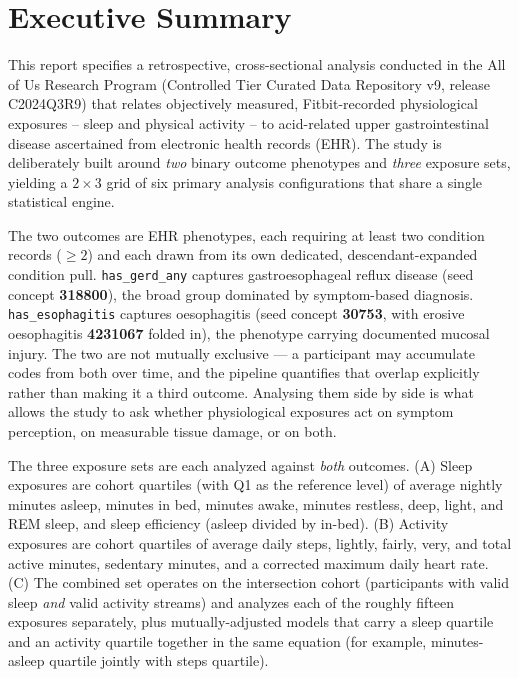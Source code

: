 \documentclass[11pt]{article}
\newcommand{\code}[1]{\texttt{\small #1}}
\begin{document}
\tableofcontents
\newpage

\newpage
\section{Executive Summary}

This report specifies a retrospective, cross-sectional analysis conducted in the All of Us Research Program (Controlled Tier Curated Data Repository v9, release C2024Q3R9) that relates objectively measured, Fitbit-recorded physiological exposures -- sleep and physical activity -- to acid-related upper gastrointestinal disease ascertained from electronic health records (EHR). The study is deliberately built around \emph{two} binary outcome phenotypes and \emph{three} exposure sets, yielding a $2 \times 3$ grid of six primary analysis configurations that share a single statistical engine.

The two outcomes are EHR phenotypes, each requiring at least two condition records
($\geq 2$) and each drawn from its own dedicated, descendant-expanded condition pull.
\code{has_gerd_any} captures gastroesophageal reflux disease (seed concept
\textbf{318800}), the broad group dominated by symptom-based diagnosis.
\code{has_esophagitis} captures oesophagitis (seed concept \textbf{30753}, with erosive
oesophagitis \textbf{4231067} folded in), the phenotype carrying documented mucosal injury.
The two are not mutually exclusive --- a participant may accumulate codes from both over
time, and the pipeline quantifies that overlap explicitly rather than making it a third
outcome. Analysing them side by side is what allows the study to ask whether physiological
exposures act on symptom perception, on measurable tissue damage, or on both.

The three exposure sets are each analyzed against \emph{both} outcomes. (A) Sleep exposures are cohort quartiles (with Q1 as the reference level) of average nightly minutes asleep, minutes in bed, minutes awake, minutes restless, deep, light, and REM sleep, and sleep efficiency (asleep divided by in-bed). (B) Activity exposures are cohort quartiles of average daily steps, lightly, fairly, very, and total active minutes, sedentary minutes, and a corrected maximum daily heart rate. (C) The combined set operates on the intersection cohort (participants with valid sleep \emph{and} valid activity streams) and analyzes each of the roughly fifteen exposures separately, plus mutually-adjusted models that carry a sleep quartile and an activity quartile together in the same equation (for example, minutes-asleep quartile jointly with steps quartile).
\end{document}
